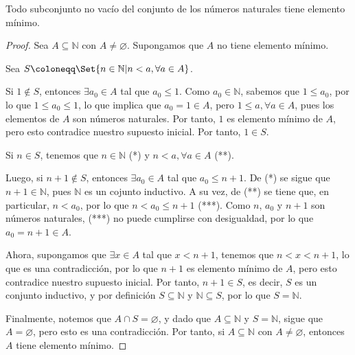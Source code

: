 \documentclass[11pt]{article}
\newcommand{\N}{\mathbb{N}}
\newcommand{\defined}{\coloneqq}
\let\emptyset\varnothing
\let\set\Set
\let\subset\subseteq
\let\intersection\cap
\begin{document}
Todo subconjunto no vacío del conjunto de los números naturales tiene elemento mínimo.

\vspace{-1em}\begin{proof} 
Sea $A\subset \N$ con $A \neq \emptyset$. Supongamos que $A$ no tiene elemento mínimo.%

Sea $S\defined \set{n\in \N| n<a, \forall a\in A}$.
%

Si $1\notin S$, entonces $\exists a_0\in A$ tal que $a_0 \leq 1$. Como $a_0\in \N$, sabemos que $1\leq a_0$, por lo que $1\leq a_0 \leq 1$, lo que implica que $a_0=1\in A$, pero $1\leq a, \forall a\in A$, pues los elementos de $A$ son números naturales. Por tanto, $1$ es elemento mínimo de $A$, pero esto contradice nuestro supuesto inicial. Por tanto, $1\in S$.
%

Si $n\in S$, tenemos que $n\in \N$ (*) y $n<a, \forall a\in A$ (**).

Luego, si $n+1\notin S$, entonces $\exists a_0\in A$ tal que $a_0 \leq n+1$. De (*) se sigue que $n+1\in \N$, pues $\N$ es un cojunto inductivo. A su vez, de (**) se tiene que, en particular, $n<a_0$, por lo que $n<a_0\leq n+1$ (***). Como $n$, $a_0$ y $n+1$ son números naturales, (***) no puede cumplirse con desigualdad, por lo que $a_0=n+1\in A$.

Ahora, supongamos que $\exists x\in A$ tal que $x<n+1$, tenemos que $n<x<n+1$, lo que es una contradicción, por lo que $n+1$ es elemento mínimo de $A$, pero esto contradice nuestro supuesto inicial. Por tanto, $n+1\in S$, es decir, $S$ es un conjunto inductivo, y por definición $S\subset \N$ y $\N\subset S$, por lo que $S=\N$.

Finalmente, notemos que $A\intersection S=\emptyset$, y dado que $A\subseteq \N$ y $S=\N$, sigue que $A=\emptyset$, pero esto es una contradicción. Por tanto, si $A\subseteq \N$ con $A\neq \emptyset$, entonces $A$ tiene elemento mínimo.
\end{proof} \vspace{-1em}

\end{document}
